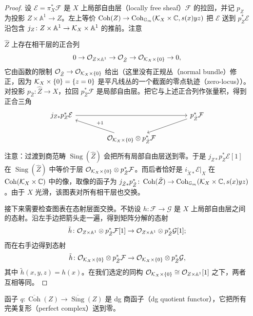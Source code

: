 \begin{proof}
设 $\mathcal E=\pi_X^*\mathcal F$ 是 $X$ 上局部自由层（locally free sheaf）$\mathcal F$ 的拉回，并记 $p_Z$ 为投影 $Z\times\mathbb A^1\to Z$。左上等价 $\operatorname{Coh}(Z)\to\operatorname{Coh}_{\mathbb G_m}(\mathcal{K}_X\times\mathbb C,s(x)yz)$ 把 $\mathcal E$ 送到 $p_Z^*\mathcal E$ 沿包含 $j_Z\colon Z\times\mathbb A^1\to\mathcal{K}_X\times\mathbb A^1$ 的推前。注意

$\hat Z$ 上存在相干层的正合列
\[
0\to\mathcal{O}_{Z\times\mathbb A^1}\to\mathcal{O}_{\hat Z}\to\mathcal{O}_{\mathcal{K}_X\times\{0\}}\to0,
\]
它由函数的限制 $\mathcal{O}_{\hat Z}\to\mathcal{O}_{\mathcal{K}_X\times\{0\}}$ 给出（这里没有正规丛（normal bundle）修正，因为 $\mathcal{K}_X\times\{0\}=\{z=0\}$ 是平凡线丛的一个截面的零点轨迹（zero-locus））。对投影 $p_{\hat Z}\colon\hat Z\to X$，拉回 $p_{\hat Z}^*\mathcal F$ 是局部自由层。把它与上述正合列作张量积，得到正合三角
\[
\begin{tikzcd}[column sep=4.2em, row sep=1.5em]
j_{Z*}p_Z^*\mathcal E \arrow[rr] & & p_{\hat Z}^*\mathcal F \arrow[dl] \\
& \OO_{\cK_X\times\{0\}}\otimes p_{\hat Z}^*\mathcal F \arrow[ul, "+1"'] &
\end{tikzcd}
\]
注意：过渡到商范畴 $\operatorname{Sing}(\hat Z)$ 会把所有局部自由层送到零。于是 $j_{Z*}p_Z^*\mathcal E[1]$ 在 $\operatorname{Sing}(\hat Z)$ 中等价于层 $\mathcal{O}_{\mathcal{K}_X\times\{0\}}\otimes p_{\hat Z}^*\mathcal F$。而后者恰好是 $i_{\tilde X*}\mathcal E|_X$ 在 $\operatorname{Coh}(\mathcal{K}_X\times\mathbb C)$ 中的像，取像的函子为 $j_{\tilde Z*}p_{\tilde Z}^*\colon\operatorname{Coh}(\tilde Z)\to\operatorname{Coh}_{\mathbb G_m}(\mathcal{K}_X\times\mathbb C,s(x)yz)$。由于 $X$ 光滑，该图表对所有相干层也交换。

接下来需要检查图表在态射层面交换。不妨设 $h\colon\mathcal F\to\mathcal G$ 是 $X$ 上局部自由层之间的态射。沿左手边把箭头走一遍，得到矩阵分解的态射
\[
\tilde h\colon\mathcal{O}_{Z\times\mathbb A^1}\otimes p_{\hat Z}^*\mathcal F[1]\to\mathcal{O}_{Z\times\mathbb A^1}\otimes p_{\hat Z}^*\mathcal G[1];
\]
而在右手边得到态射
\[
\tilde h\colon\mathcal{O}_{\mathcal{K}_X\times\{0\}}\otimes p_{\hat Z}^*\mathcal F\to\mathcal{O}_{\mathcal{K}_X\times\{0\}}\otimes p_{\hat Z}^*\mathcal G,
\]
其中 $\tilde h(x,y,z)=h(x)$。在我们选定的同构 $\mathcal{O}_{\mathcal{K}_X\times\{0\}}\cong\mathcal{O}_{Z\times\mathbb A^1}[1]$ 之下，两者互相等同。
\end{proof}

\begin{definition}\label{def:8-1-3}
函子 $q\colon\overline{\operatorname{Coh}}(Z)\to\overline{\operatorname{Sing}}(Z)$ 是 dg 商函子（dg quotient functor），它把所有完美复形（perfect complex）送到零。
\end{definition}

